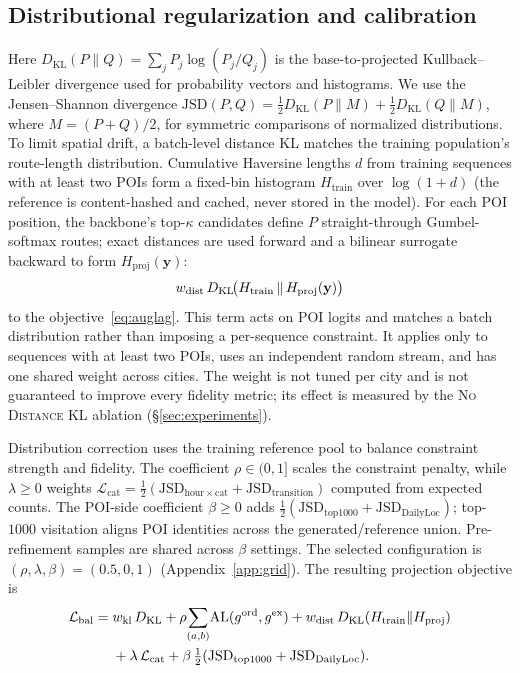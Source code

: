 \subsection{Distributional regularization and calibration}
\label{sec:method:distance}
\label{sec:method:balance}
Here $D_{\mathrm{KL}}(P\|Q)=\sum_jP_j\log(P_j/Q_j)$ is the
base-to-projected Kullback--Leibler divergence used for probability vectors and
histograms. We use the Jensen--Shannon divergence
$\mathrm{JSD}(P,Q)=\tfrac12D_{\mathrm{KL}}(P\|M)+\tfrac12D_{\mathrm{KL}}(Q\|M)$,
where $M=(P+Q)/2$, for symmetric comparisons of normalized distributions.
To limit spatial drift, a batch-level distance KL matches the training
population's route-length distribution. Cumulative Haversine lengths $d$ from
training sequences with at least two POIs form a fixed-bin histogram
$H_{\mathrm{train}}$ over $\log(1+d)$ (the reference is content-hashed and cached,
never stored in the model). For each POI position, the backbone's
top-$\kappa$ candidates define $P$ straight-through Gumbel-softmax routes; exact
distances are used forward and a bilinear surrogate backward to form
$H_{\mathrm{proj}}(\mathbf{y})$:
\begin{equation}
  w_{\mathrm{dist}}\,D_{\mathrm{KL}}\!\big(H_{\mathrm{train}}\,\|\,H_{\mathrm{proj}}(\mathbf{y})\big)
  \label{eq:distance}
\end{equation}
to the objective~\eqref{eq:auglag}. This term acts on POI logits and matches a
batch distribution rather than imposing a per-sequence constraint. It applies
only to sequences with at least two POIs, uses an independent random stream, and
has one shared weight across cities. The weight is not tuned per city and is not
guaranteed to improve every fidelity metric; its effect is measured by the
\textsc{No Distance KL} ablation (\S\ref{sec:experiments}).

Distribution correction uses the training reference pool to balance constraint
strength and fidelity. The coefficient $\rho\in(0,1]$ scales the constraint
penalty, while $\lambda\geq0$ weights
$\mathcal{L}_{\mathrm{cat}}=\tfrac12(\mathrm{JSD}_{\mathrm{hour}\times\mathrm{cat}}+
\mathrm{JSD}_{\mathrm{transition}})$ computed from expected counts. The POI-side
coefficient $\beta\geq0$ adds
$\tfrac12(\mathrm{JSD}_{\mathrm{top}1000}+\mathrm{JSD}_{\mathrm{DailyLoc}})$;
top-$1000$ visitation aligns POI identities across the generated/reference union.
Pre-refinement samples are shared across $\beta$ settings. The selected
configuration is $(\rho,\lambda,\beta)=(0.5,0,1)$ (Appendix~\ref{app:grid}).
The resulting projection objective is
\begin{equation}
\begin{aligned}
 \mathcal{L}_{\mathrm{bal}}={}&w_{\mathrm{kl}}\,D_{\mathrm{KL}}
 +\rho\!\sum_{(a,b)}\!\mathrm{AL}(g^{\mathrm{ord}},g^{\mathrm{ex}})
 +w_{\mathrm{dist}}\,D_{\mathrm{KL}}(H_{\mathrm{train}}\|H_{\mathrm{proj}})\\
 &+\lambda\,\mathcal{L}_{\mathrm{cat}}+
 \beta\,\tfrac12(\mathrm{JSD}_{\mathrm{top}1000}+\mathrm{JSD}_{\mathrm{DailyLoc}}).
\end{aligned}
\label{eq:balance}
\end{equation}

